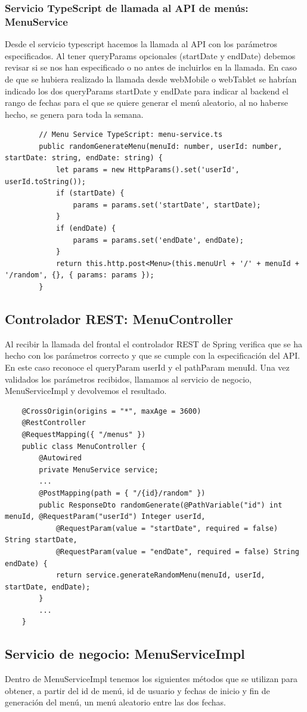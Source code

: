 \documentclass[12pt, a4paper, twoside]{book}
\begin{document}
	\subsubsection{Servicio TypeScript de llamada al API de menús: MenuService}
	Desde el servicio typescript hacemos la llamada al API con los parámetros especificados. Al tener queryParams opcionales (startDate y endDate) debemos revisar si se nos han especificado o no antes de incluirlos en la llamada.
	En caso de que se hubiera realizado la llamada desde webMobile o webTablet se habrían indicado los dos queryParams startDate y endDate para indicar al backend el rango de fechas para el que se quiere generar el menú aleatorio, al no haberse hecho, se genera para toda la semana.
	\begin{lstlisting}						
		// Menu Service TypeScript: menu-service.ts
		public randomGenerateMenu(menuId: number, userId: number, startDate: string, endDate: string) {
			let params = new HttpParams().set('userId', userId.toString());
			if (startDate) {
				params = params.set('startDate', startDate);
			}
			if (endDate) {
				params = params.set('endDate', endDate);
			}
			return this.http.post<Menu>(this.menuUrl + '/' + menuId + '/random', {}, { params: params });
		}
	\end{lstlisting}
	\subsection{Controlador REST: MenuController}
	Al recibir la llamada del frontal el controlador REST de Spring verifica que se ha hecho con los parámetros correcto y que se cumple con la especificación del API. En este caso reconoce el queryParam userId y el pathParam menuId.	
	Una vez validados los parámetros recibidos, llamamos al servicio de negocio, MenuServiceImpl y devolvemos el resultado.
	\begin{lstlisting}
	@CrossOrigin(origins = "*", maxAge = 3600)
	@RestController
	@RequestMapping({ "/menus" })
	public class MenuController {
		@Autowired
		private MenuService service;
		...
		@PostMapping(path = { "/{id}/random" })
		public ResponseDto randomGenerate(@PathVariable("id") int menuId, @RequestParam("userId") Integer userId,
			@RequestParam(value = "startDate", required = false) String startDate,
			@RequestParam(value = "endDate", required = false) String endDate) {
			return service.generateRandomMenu(menuId, userId, startDate, endDate);
		}
		...
	}
	\end{lstlisting}
	
	\subsection{Servicio de negocio: MenuServiceImpl}
	Dentro de MenuServiceImpl tenemos los siguientes métodos que se utilizan para obtener, a partir del id de menú, id de usuario y fechas de inicio y fin de generación del menú, un menú aleatorio entre las dos fechas.\\
	
\end{document}
